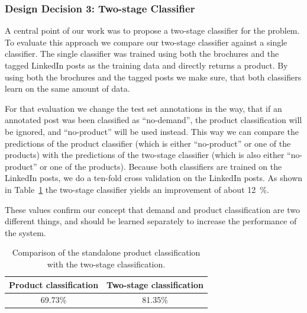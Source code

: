 \subsubsection{Design Decision 3: Two-stage Classifier}
\label{sub:two_stage_classifier}

A central point of our work was to propose a two-stage classifier for the \nto problem.
To evaluate this approach we compare our two-stage classifier against a single classifier.
The single classifier was trained using both the brochures and the tagged LinkedIn posts as the training data and directly returns a product.
By using both the brochures and the tagged posts we make sure, that both classifiers learn on the same amount of data.

For that evaluation we change the test set annotations in the way, that if an annotated post was been classified as ``no-demand'', the product classification will be ignored, and ``no-product'' will be used instead.
This way we can compare the predictions of the product classifier (which is either ``no-product'' or one of the products) with the predictions of the two-stage classifier (which is also either ``no-product'' or one of the products).
Because both classifiers are trained on the LinkedIn posts, we do a ten-fold cross validation on the LinkedIn posts.
As shown in Table~\ref{table:two_stage_eval} the two-stage classifier yields an improvement of about 12~\%.

These values confirm our concept that demand and product classification are two different things, and should be learned separately to increase the performance of the system.

\begin{table}
	\centering
	\begin{tabular}{c|c}
		\hline
		Product classification & Two-stage classification \\
		\hline \hline
		69.73\% & 81.35\% \\
		\hline
	\end{tabular}
	\caption{Comparison of the standalone product classification with the two-stage classification.}
	\label{table:two_stage_eval}
\end{table}
